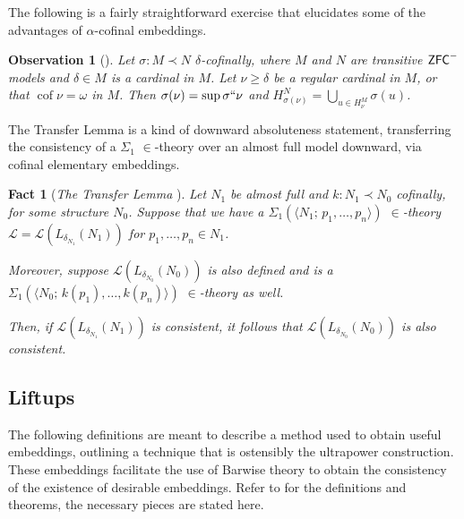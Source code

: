 \documentclass{amsart}
\newtheorem{observation}[theorem]{Observation}
\newtheorem{fact}[theorem]{Fact}
\theoremstyle{definition}
\newtheorem{definition}[theorem]{Definition}
\theoremstyle{remark}
\newcommand{\ZFC}{\textup{\ensuremath{\textsf{ZFC}}}}
\DeclareMathOperator{\cof}{cof}
\begin{document}
The following is a fairly straightforward exercise that elucidates some of the advantages of $\alpha$-cofinal embeddings.

\begin{observation}[{\cite[Cor. 3.7]{Jensen:2014}}] \label{observation:regularitySups}
Let $\sigma:M \prec N$ $\delta$-cofinally, where $M$ and $N$ are transitive $\ZFC^-$ models and $\delta \in M$ is a cardinal in $M$. Let $\nu \geq \delta$ be a regular cardinal in $M$, or that $\cof \nu = \omega$ in $M$. Then $\sigma(\nu)=\sup \sigma``\nu$ and $H_{\sigma(\nu)}^N=\bigcup_{u \in H_\nu^M}\sigma(u)$.
\end{observation}

The Transfer Lemma is a kind of downward absoluteness statement, transferring the consistency of a $\Sigma_1$ $\in$-theory over an almost full model downward, via cofinal elementary embeddings. 

\begin{fact}[\emph{The Transfer Lemma} {\cite[Lemma 4.5]{Jensen:2014}}]\label{fact:Transfer} Let $N_1$ be almost full and $k: N_1 \prec N_0$ cofinally, for some structure $N_0$. Suppose that we have a $\Sigma_1(\langle N_1; \, p_1, \dots, p_n\rangle)$  $\in$-theory $\mathcal L=\mathcal L(L_{\delta_{N_1}}(N_1))$  for $p_1, \dots, p_n \in N_1$.

Moreover, suppose $\mathcal L(L_{\delta_{N_0}}(N_0))$ is also defined and is a $\Sigma_1(\langle N_0; \, k(p_1), \dots, k(p_n)\rangle)$ $\in$-theory as well. 

Then, 
if $\mathcal L(L_{\delta_{N_1}}(N_1))$ is consistent, it follows that $\mathcal L(L_{\delta_{N_0}}(N_0))$ is also consistent. \end{fact} 

\subsection{Liftups}
\label{subsec:Liftups}
The following definitions are meant to describe a method used to obtain useful embeddings, outlining a technique that is ostensibly the ultrapower construction. These embeddings facilitate the use of Barwise theory to obtain the consistency of the existence of desirable embeddings. Refer to \cite[Ch. 3]{Jensen:2014} for the definitions and theorems, the necessary pieces are stated here.
	
\end{document}
